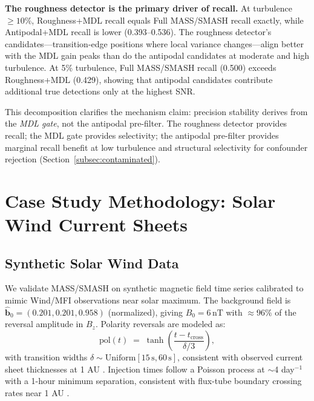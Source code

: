 \documentclass[12pt,letterpaper]{article}
\newcommand{\nT}{\,\mathrm{nT}}
\newcommand{\secunit}{\,\mathrm{s}}
\begin{document}
\textbf{The roughness detector is the primary driver of recall.}
At turbulence $\geq 10\%$, Roughness+MDL recall equals Full MASS/SMASH
recall exactly, while Antipodal+MDL recall is lower (0.393--0.536).
The roughness detector's candidates---transition-edge positions where local
variance changes---align better with the MDL gain peaks than do the antipodal
candidates at moderate and high turbulence.
At 5\% turbulence, Full MASS/SMASH recall (0.500) exceeds Roughness+MDL
(0.429), showing that antipodal candidates contribute additional true
detections only at the highest SNR.

This decomposition clarifies the mechanism claim: precision stability derives
from the \emph{MDL gate}, not the antipodal pre-filter.
The roughness detector provides recall; the MDL gate provides selectivity;
the antipodal pre-filter provides marginal recall benefit at low turbulence
and structural selectivity for confounder rejection
(Section~\ref{subsec:contaminated}).

\section{Case Study Methodology: Solar Wind Current Sheets}
\label{sec:casestudy}

\subsection{Synthetic Solar Wind Data}
\label{subsec:synth}

We validate MASS/SMASH on synthetic magnetic field time series calibrated to
mimic Wind/MFI observations near solar maximum.
The background field is $\hat{\mathbf{b}}_0 = (0.201, 0.201, 0.958)$
(normalized), giving $B_0 = 6\nT$ with $\approx 96\%$ of the reversal
amplitude in $B_z$.
Polarity reversals are modeled as:
\begin{equation}
  \mathrm{pol}(t) \;=\; \tanh\!\left(\frac{t - t_\mathrm{cross}}{\delta/3}\right),
  \label{eq:tanh}
\end{equation}
with transition widths $\delta \sim \mathrm{Uniform}[15\secunit, 60\secunit]$,
consistent with observed current sheet thicknesses at 1 AU \citep{Vasquez2007}.
Injection times follow a Poisson process at $\sim$4 day$^{-1}$ with a 1-hour
minimum separation, consistent with flux-tube boundary crossing rates near
1 AU \citep{Wilcox1965}.
\end{document}

